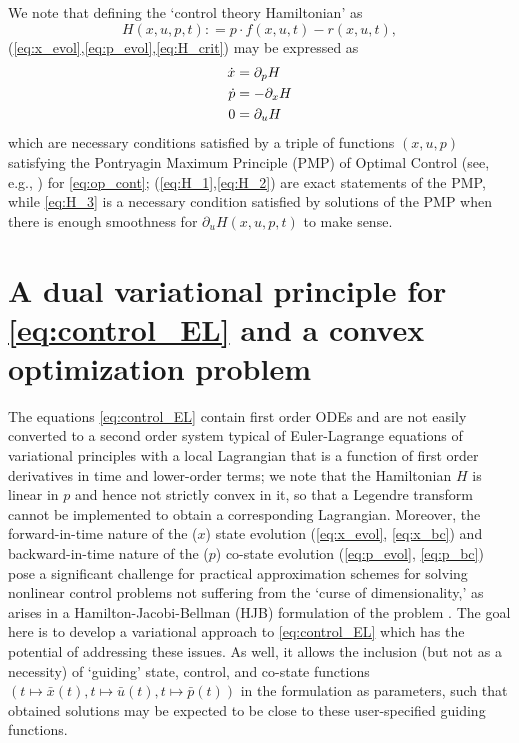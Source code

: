 \documentclass[11pt]{article}
\newcommand{\p}{\partial}
\begin{document}
We note that defining the `control theory Hamiltonian' \cite[Sec.~4.3]{evans1983introduction} as
\[
H(x,u,p,t) : = p  \cdot f(x,u,t) - r(x,u,t),
\]
(\ref{eq:x_evol},\ref{eq:p_evol},\ref{eq:H_crit}) may be expressed as
\begin{subequations}
\allowdisplaybreaks
\begin{align}
     \dot{x} & = \p_p H \label{eq:H_1}\\
    \dot{p}  &= - \p_x H \label{eq:H_2}\\
     0  &= \p_u H \label{eq:H_3}
\end{align}
\end{subequations}
which are necessary conditions satisfied by a triple of functions $(x,u,p)$ satisfying the Pontryagin Maximum Principle (PMP) of Optimal Control (see, e.g., \cite{evans1983introduction}) for \eqref{eq:op_cont}; (\ref{eq:H_1},\ref{eq:H_2}) are exact statements of the PMP, while \eqref{eq:H_3} is a necessary condition satisfied by solutions of the PMP when there is enough smoothness for $\p_u H (x,u,p,t)$ to make sense.

\section{A dual variational principle for \eqref{eq:control_EL} and a convex optimization problem}\label{sec:dual_vp}
The equations \eqref{eq:control_EL} contain first order ODEs and are not easily converted to a second order system typical of Euler-Lagrange equations of variational principles with a local Lagrangian that is a function of first order derivatives in time and lower-order terms; we note that the Hamiltonian $H$ is linear in $p$ and hence not strictly convex in it, so that a Legendre transform cannot be implemented to obtain a corresponding Lagrangian. Moreover, the forward-in-time nature of the ($x$) state  evolution (\ref{eq:x_evol}, \ref{eq:x_bc}) and backward-in-time nature of the ($p$) co-state evolution (\ref{eq:p_evol}, \ref{eq:p_bc}) pose a significant challenge for practical approximation schemes for solving nonlinear control problems not suffering from the `curse of dimensionality,' as arises in a Hamilton-Jacobi-Bellman (HJB) formulation \cite[Secs.~5.1.2,5.1.3]{evans1983introduction} of the problem \cite{borggaard2020quadratic,krener,navasca2000solution,al1961optimal}. The goal here is to develop a variational approach to \eqref{eq:control_EL} which has the potential of addressing these issues. As well, it allows the inclusion (but not as a necessity) of `guiding' state, control, and co-state functions $(t \mapsto \bar{x}(t), t \mapsto \bar{u}(t), t \mapsto \bar{p}(t))$ in the formulation as parameters, such that obtained solutions may be expected to be close to these user-specified guiding functions.
\end{document}
